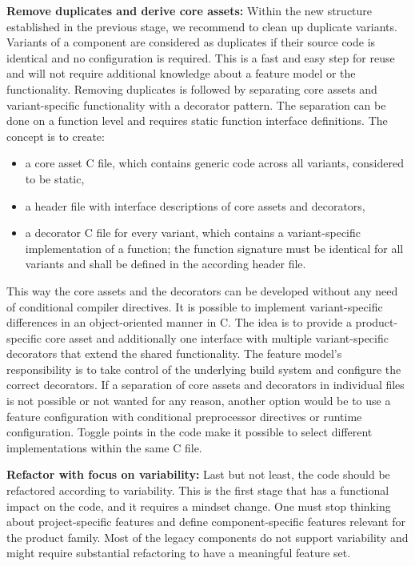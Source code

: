\textbf{Remove duplicates and derive core assets:} Within the new structure
established in the previous stage, we recommend to clean up duplicate variants.
Variants of a component are considered as duplicates if their source code is
identical and no configuration is required. This is a fast and easy step for
reuse and will not require additional knowledge about a feature model or the
functionality. Removing duplicates is followed by separating core assets and
variant-specific functionality with a decorator pattern. The separation can be
done on a function level and requires static function interface definitions. The
concept is to create:
\begin{itemize}
  \item a core asset C file, which contains generic code across all variants,
        considered to be static,
  \item a header file with interface descriptions of core assets and decorators,
  \item a decorator C file for every variant, which contains a variant-specific
        implementation of a function; the function signature must be identical
        for all variants and shall be defined in the according header file.
\end{itemize}
This way the core assets and the decorators can be developed without any need of
conditional compiler directives. It is possible to implement variant-specific
differences in an object-oriented manner in C. The idea is to provide a
product-specific core asset and additionally one interface with multiple
variant-specific decorators that extend the shared functionality. The feature
model's responsibility is to take control of the underlying build system and
configure the correct decorators. If a separation of core assets and
decorators in individual files is not possible or not wanted for any reason,
another option would be to use a feature configuration with conditional
preprocessor directives or runtime configuration. Toggle points in the code make
it possible to select different implementations within the same C file.

\textbf{Refactor with focus on variability:} Last but not least, the code should
be refactored according to variability. This is the first stage that has a
functional impact on the code, and it requires a mindset change. One must stop
thinking about project-specific features and define component-specific features
relevant for the product family. Most of the legacy components do not support
variability and might require substantial refactoring to have a meaningful
feature set.

